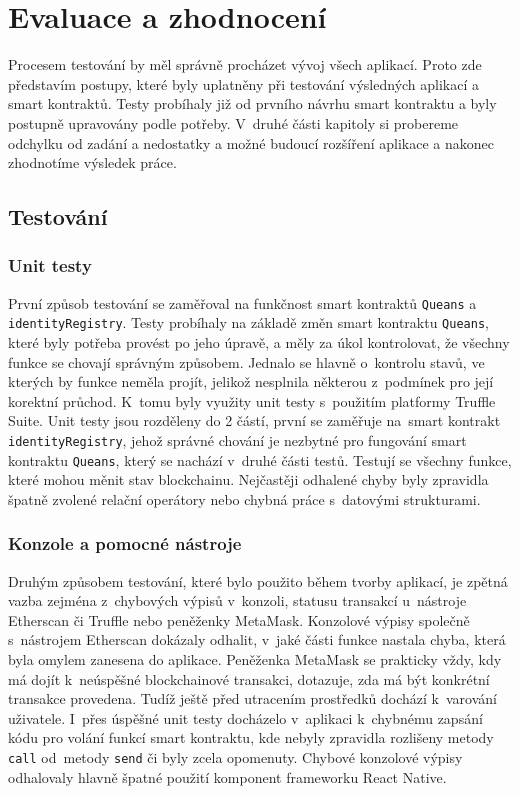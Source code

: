 \chapter{Evaluace a zhodnocení}
\label{chapter:7}
Procesem testování by měl správně procházet vývoj všech aplikací. Proto zde představím postupy, které byly uplatněny při testování výsledných aplikací a smart kontraktů. Testy probíhaly již od prvního návrhu smart kontraktu a byly postupně upravovány podle potřeby. V~druhé části kapitoly si probereme odchylku od zadání a nedostatky a možné budoucí rozšíření aplikace a nakonec zhodnotíme výsledek práce. 

\section{Testování}
\subsection*{Unit testy}
První způsob testování se zaměřoval na funkčnost smart kontraktů \texttt{Queans} a \texttt{identity\-Registry}. Testy probíhaly na základě změn smart kontraktu \texttt{Queans}, které byly potřeba provést po jeho úpravě, a měly za úkol kontrolovat, že všechny funkce se chovají správným způsobem. Jednalo se hlavně o~kontrolu stavů, ve kterých by funkce neměla projít, jelikož nesplnila některou z~podmínek pro její korektní průchod. K~tomu byly využity unit testy s~použitím platformy Truffle Suite. Unit testy jsou rozděleny do 2 částí, první se zaměřuje na~smart kontrakt \texttt{identityRegistry}, jehož správné chování je nezbytné pro fungování smart kontraktu \texttt{Queans}, který se nachází v~druhé části testů. Testují se všechny funkce, které mohou měnit stav blockchainu. Nejčastěji odhalené chyby byly zpravidla špatně zvolené relační operátory nebo chybná práce s~datovými strukturami.

\subsection*{Konzole a pomocné nástroje}
Druhým způsobem testování, které bylo použito během tvorby aplikací, je zpětná vazba zejména z~chybových výpisů v~konzoli, statusu transakcí u~nástroje Etherscan či Truffle nebo peněženky MetaMask. Konzolové výpisy společně s~nástrojem Etherscan dokázaly odhalit, v~jaké části funkce nastala chyba, která byla omylem zanesena do aplikace. Peněženka MetaMask se prakticky vždy, kdy má dojít k~neúspěšné blockchainové transakci, dotazuje, zda má být konkrétní transakce provedena. Tudíž ještě před utracením prostředků dochází k~varování uživatele. I~přes úspěšné unit testy docházelo v~aplikaci k~chybnému zapsání kódu pro volání funkcí smart kontraktu, kde nebyly zpravidla rozlišeny metody \texttt{call} od~metody \texttt{send} či byly zcela opomenuty. Chybové konzolové výpisy odhalovaly hlavně špatné použití komponent frameworku React Native.  

